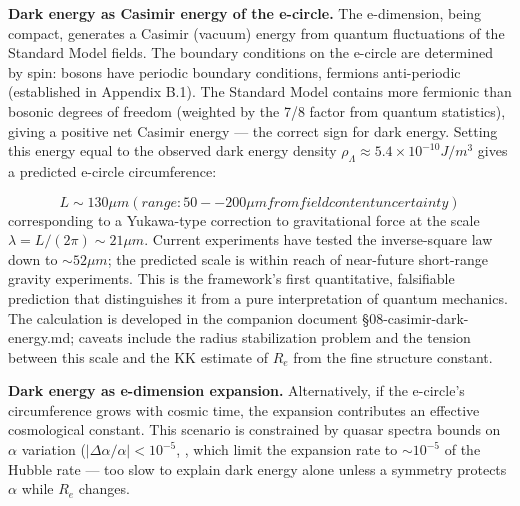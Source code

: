 \documentclass[aps,prd,preprint,superscriptaddress,longbibliography,floatfix]{revtex4-2}
\theoremstyle{remark}
\begin{document}
\textbf{Dark energy as Casimir energy of the e-circle.} The e-dimension, being compact, generates a Casimir (vacuum) energy from quantum fluctuations of the Standard Model fields. The boundary conditions on the e-circle are determined by spin: bosons have periodic boundary conditions, fermions anti-periodic (established in Appendix B.1). The Standard Model contains more fermionic than bosonic degrees of freedom (weighted by the 7/8 factor from quantum statistics), giving a positive net Casimir energy --- the correct sign for dark energy. Setting this energy equal to the observed dark energy density $\rho_\Lambda \approx 5.4 \times 10^{-10} J/m^{3}$ gives a predicted e-circle circumference:


\begin{equation}
    L \sim  130 \mu m  (range: 50--200 \mu m from field content uncertainty)
\end{equation}
corresponding to a Yukawa-type correction to gravitational force at the scale $\lambda = L/(2\pi) \sim  21 \mu m$. Current experiments \cite{Leeetal2020} have tested the inverse-square law down to $\sim 52 \mu m$; the predicted scale is within reach of near-future short-range gravity experiments. This is the framework's first quantitative, falsifiable prediction that distinguishes it from a pure interpretation of quantum mechanics. The calculation is developed in the companion document \S{}08-casimir-dark-energy.md; caveats include the radius stabilization problem and the tension between this scale and the KK estimate of $R_e$ from the fine structure constant.

\textbf{Dark energy as e-dimension expansion.} Alternatively, if the e-circle's circumference grows with cosmic time, the expansion contributes an effective cosmological constant. This scenario is constrained by quasar spectra bounds on $\alpha$ variation ($|\Delta\alpha/\alpha| < 10^{-5}$, \cite{Webbetal2011}, which limit the expansion rate to $\sim 10^{-5}$ of the Hubble rate --- too slow to explain dark energy alone unless a symmetry protects $\alpha$ while $R_e$ changes.
\end{document}
